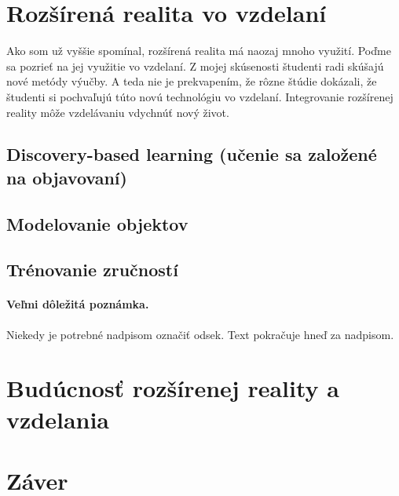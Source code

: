 \documentclass[10pt,oneside,slovak,a4paper]{article}
\begin{document}
\section{Rozšírená realita vo vzdelaní} \label{rozsirenaVzdelanie}
Ako som už vyššie spomínal, rozšírená realita má naozaj mnoho využití. 
Poďme sa pozrieť na jej využitie vo vzdelaní.
Z mojej skúsenosti študenti radi skúšajú nové metódy výučby.
A teda nie je prekvapením, že rôzne štúdie dokázali, že študenti si pochvaľujú túto novú technológiu vo vzdelaní.\cite{Saidin2015}
Integrovanie rozšírenej reality môže vzdelávaniu vdychnúť nový život.

\subsection{Discovery-based learning (učenie sa založené na objavovaní)} \label{rozsirenaVzdelanie:dbl}

\subsection{Modelovanie objektov} \label{rozsirenaVzdelanie:modelovanie}

\subsection{Trénovanie zručností} \label{rozsirenaVzdelanie:zrucnosti}

\paragraph{Veľmi dôležitá poznámka.}
Niekedy je potrebné nadpisom označiť odsek. Text pokračuje hneď za nadpisom.



\section{Budúcnosť rozšírenej reality a vzdelania} \label{rozsirenaBuducnost}


\section{Záver} \label{zaver} %






\end{document}

